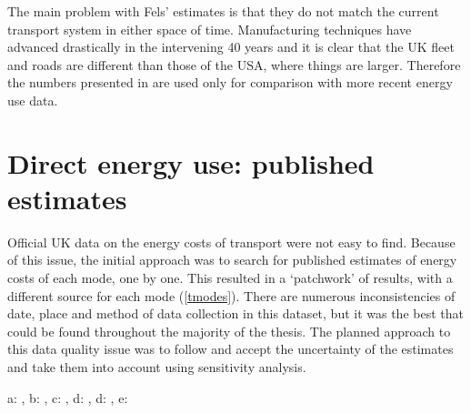 The main problem with Fels' estimates is that they do not match the current
transport system in either space of time. Manufacturing techniques have
advanced drastically in the intervening 40 years and it is clear that the UK
fleet and roads are different than those of the USA, where things are larger.
Therefore the numbers presented in \citet{Fels1975} are
used only for comparison with more recent energy use data.

\section{Direct energy use: published estimates} \label{sdirecte}
Official UK data on the energy costs of transport were not easy to find.
Because of this issue, the initial approach was to search for published
estimates of energy costs of each mode, one by one. This resulted in a
`patchwork' of results, with a different source for each mode (\cref{tmodes}).
There are numerous inconsistencies of date, place and method of data collection
in this dataset, but it was the best that could be found throughout the
majority of the thesis. The planned approach to this data quality issue was to
follow \citet{Lovelace2011-assessing} and accept the uncertainty of the estimates and
take them into account using sensitivity analysis. %

\begin{table}[t]
\caption{Direct energy use of selected modes}
\label{tmodes}
\begin{footnotesize}

\vspace{1cm}
 a: \citep{Coley2002}, b: \citep{Hansard2005}, c:
\citep{MacKay2009}, d: \citep{DfT2011-commuting}, d:
\citep{LondonUnderground2007}, e: \citep{ORNL2011}
\end{footnotesize} %
\end{table}


